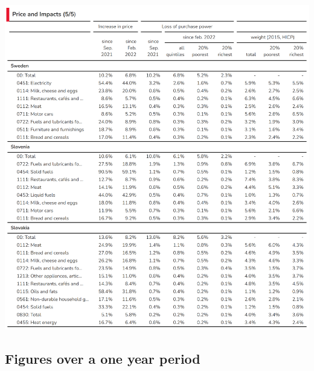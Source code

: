 \documentclass[
  9pt,
  a4paper,
  numbers=noendperiod,
  DIV=12]{scrartcl}
\begin{document}
\includegraphics{svg/annex_5.png}

\newpage

\hypertarget{figures-over-a-one-year-period}{%
\subsection{Figures over a one year
period}\label{figures-over-a-one-year-period}}
\end{document}
